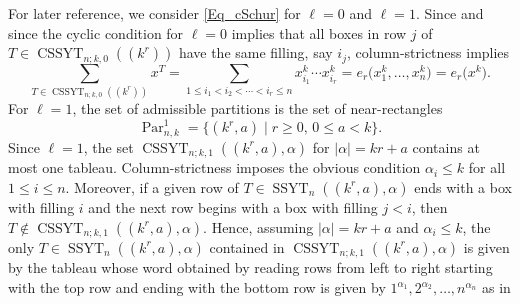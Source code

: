 \documentclass[pdftex]{sigma}
\numberwithin{equation}{section}
\renewcommand{\leq}{\leqslant}
\renewcommand{\geq}{\geqslant}
\DeclareMathOperator{\Par}{Par}
\DeclareMathOperator{\SSYT}{SSYT}
\DeclareMathOperator{\CSSYT}{CSSYT}
\newcommand{\abs}[1]{\vert#1\vert}
\begin{document}
For later reference, we consider \eqref{Eq_cSchur} for $\ell=0$ and
$\ell=1$.
Since \smash{$\Par_{n,k}^0=\{(k^r) \mid 0\leq r\leq n\}$} and since the cyclic
condition for $\ell=0$ implies that all boxes in row $j$ of
$T\in\CSSYT_{n;k,0}((k^r))$ have the same filling, say $i_j$,
column-strictness implies
\begin{equation}\label{Eq_nul}
\sum_{T\in\CSSYT_{n;k,0}((k^r))}x^T=\sum_{1\leq i_1<i_2<\cdots<i_r\leq n}
x_{i_1}^k \cdots x_{i_r}^k = e_r\bigl(x_1^k,\dots,x_n^k\bigr)=e_r\bigl(x^k\bigr).
\end{equation}
For $\ell=1$, the set of admissible partitions is the set of
near-rectangles
\[
\Par_{n,k}^1=\{(k^r,a) \mid r\geq 0,\, 0\leq a<k\}.
\]
Since $\ell=1$, the set $\CSSYT_{n;k,1}((k^r,a),\alpha)$ for
$\abs{\alpha}=kr+a$ contains at most one tableau.
Column-strictness imposes the obvious condition $\alpha_i\leq k$
for all $1\leq i\leq n$.
Moreover, if a given row of $T\in\SSYT_n((k^r,a),\alpha)$ ends with
a box with filling $i$ and the next row begins with a box
with filling $j<i$, then $T\not\in\CSSYT_{n;k,1}((k^r,a),\alpha)$.
Hence, assuming $\abs{\alpha}=kr+a$ and $\alpha_i\leq k$,
the only $T\in\SSYT_n((k^r,a),\alpha)$ contained in
$\CSSYT_{n;k,1}((k^r,a),\alpha)$ is given by the tableau
whose word obtained by reading rows from left
to right starting with the top row
and ending with the bottom row is given by
$1^{\alpha_1},2^{\alpha_2},\dots,n^{\alpha_n}$ as in
\begin{center}
\end{center}
\end{document}
